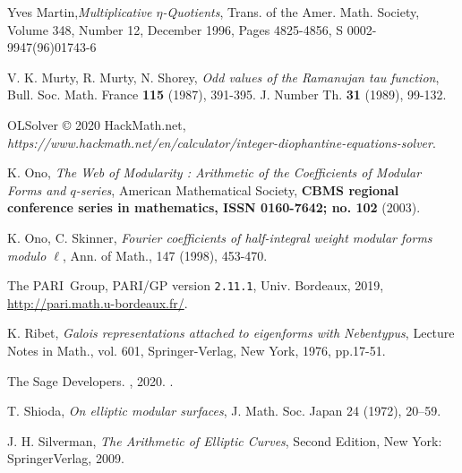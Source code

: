 \documentclass[12pt]{amsart}
\numberwithin{equation}{section}
\begin{document}
\begin{thebibliography}{99}
 Yves Martin,\emph{Multiplicative $\eta$-Quotients}, Trans. of the Amer. Math. Society, Volume 348, Number 12, December 1996, Pages 4825-4856, S 0002-9947(96)01743-6

 V. K. Murty, R. Murty, N. Shorey, \emph{Odd values of the Ramanujan tau function},
Bull. Soc. Math. France \textbf{115} (1987), 391-395.
J. Number Th. \textbf{31} (1989), 99-132.

 {OLSolver} © 2020 HackMath.net, \emph{https://www.hackmath.net/en/calculator/integer-diophantine-equations-solver}.

 K. Ono, \emph{The Web of Modularity : Arithmetic of the Coefficients of Modular Forms and $q$-series}, American Mathematical Society, \textbf{CBMS regional conference series in mathematics, ISSN 0160-7642; no. 102} (2003).

 K. Ono, C. Skinner, \emph{Fourier coefficients of half-integral weight modular forms modulo $\ell$}, Ann. of Math., 147 (1998), 453-470.

    The PARI~Group, PARI/GP version \texttt{2.11.1}, Univ. Bordeaux, 2019,
    \url{http://pari.math.u-bordeaux.fr/}.

 K. Ribet, \emph{Galois representations attached to eigenforms with Nebentypus}, Lecture Notes in Math., vol. 601, Springer-Verlag, New York, 1976, pp.17-51.

 {The Sage Developers}. , 2020. .
  

 T. Shioda,
\emph{On elliptic modular surfaces}, J. Math. Soc. Japan 24 (1972), 20–59.



 J. H. Silverman, \emph{The Arithmetic of Elliptic Curves}, Second Edition, New York: SpringerVerlag, 2009. 

\end{thebibliography}
\end{document}

